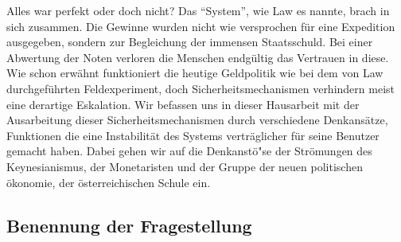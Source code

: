 \documentclass[
        onecolumn,
        a4paper,
        abstracton,
        parskip=half
        ,final
        ]{scrartcl}
\begin{document}
Alles war perfekt oder doch nicht? Das "`System"', wie Law es nannte, brach in sich zusammen. Die Gewinne wurden nicht wie versprochen f{\"u}r eine Expedition ausgegeben, sondern zur Begleichung der immensen Staatsschuld. Bei einer Abwertung der Noten verloren die Menschen endg{\"u}ltig das Vertrauen in diese.
Wie schon erw{\"a}hnt funktioniert die heutige Geldpolitik wie bei dem von Law durchgef{\"u}hrten Feldexperiment, doch Sicherheitsmechanismen verhindern meist eine derartige Eskalation.
Wir befassen uns in dieser Hausarbeit mit der Ausarbeitung dieser Sicherheitsmechanismen durch verschiedene Denkans{\"a}tze, Funktionen die eine Instabilit{\"a}t des Systems vertr{\"a}glicher f{\"u}r seine Benutzer gemacht haben. Dabei gehen wir auf die Denkanst{\"o}{"s}e der Str{\"o}mungen des Keynesianismus, der Monetaristen und der Gruppe der neuen politischen {\"o}konomie, der {\"o}sterreichischen Schule ein.







\subsection{Benennung der Fragestellung}

\end{document}
